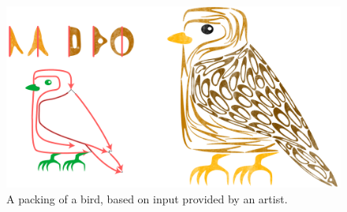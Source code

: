 \makeatletter %
\setlength{\@fptop}{0pt} %
\makeatother %
\begin{figure}
\centering
\includegraphics[width=1.0\textwidth]{figures/flowpak/bird_square.pdf}
\caption[A packing of a bird]
{A packing of a bird, based on input provided by
  an artist.}
\label{bird_square}
\end{figure}